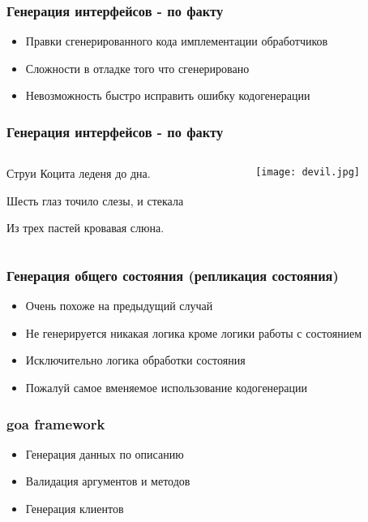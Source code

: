 \documentclass[mathserif,serif]{beamer}
\begin{document}
\begin{frame}
	\frametitle{Генерация интерфейсов - по факту}
	\begin{itemize}
		\item{Правки сгенерированного кода имплементации обработчиков}
		\item{Сложности в отладке того что сгенерировано}
		\item{Невозможность быстро исправить ошибку кодогенерации}
	\end{itemize}
\end{frame}

\begin{frame}
	\frametitle{Генерация интерфейсов - по факту}
	\begin{columns}[T]
		\begin{column}{.7\linewidth}
			\begin{minipage}[c][\textheight][c]{\linewidth}
          	Струи Коцита леденя до дна.

             Шесть глаз точило слезы, и стекала

             Из трех пастей кровавая слюна.
			\end{minipage}
		\end{column}
		\begin{column}{.4\linewidth}
			\texttt{[image: devil.jpg]}
		\end{column}
	\end{columns}
\end{frame}

\begin{frame}
	\frametitle{Генерация общего состояния (репликация состояния)}
	\begin{itemize}
		\item{Очень похоже на предыдущий случай}
		\item{Не генерируется никакая логика кроме логики работы с состоянием}
		\item{Исключительно логика обработки состояния}
		\item{Пожалуй самое вменяемое использование кодогенерации}
	\end{itemize}
\end{frame}

\begin{frame}
	\frametitle{goa framework}
	\begin{itemize}
		\item{Генерация данных по описанию}
		\item{Валидация аргументов и методов}
		\item{Генерация клиентов}
	\end{itemize}
\end{frame}
\end{document}
